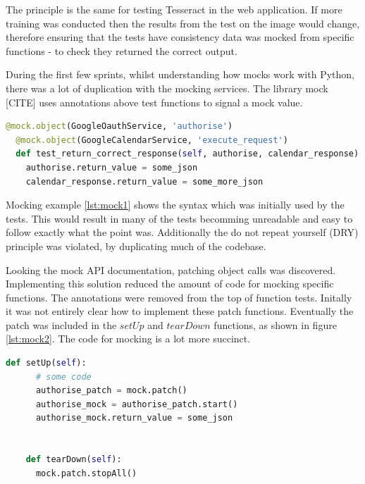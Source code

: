 The principle is the same for testing Tesseract in the web application. If more training was conducted then the results from the test on the image would change, therefore ensuring that the tests have consistency data was mocked from specific functions - to check they returned the correct output.

During the first few sprints, whilst understanding how mocks work with Python, there was a lot of duplication with the mocking services. The library mock [CITE] uses annotations above test functions to signal a mock value.

\begin{lstlisting}[language=python, caption={An example of using mocks, following the annotation pattern}, label={lst:mock1}, breaklines, columns=fullflexible, keywordstyle=\color{blue}]
  @mock.object(GoogleOauthService, 'authorise')
  @mock.object(GoogleCalendarService, 'execute_request')
  def test_return_correct_response(self, authorise, calendar_response):
    authorise.return_value = some_json
    calendar_response.return_value = some_more_json
\end{lstlisting}

Mocking example \ref{lst:mock1} shows the syntax which was initially used by the tests. This would result in many of the tests becomming unreadable and easy to follow exactly what the point was. Additionally the do not repeat yourself (DRY) principle was violated, by duplicating much of the codebase.

Looking the mock API documentation, patching object calls was discovered. Implementing this solution reduced the amount of code for mocking specific functions. The annotations were removed from the top of function tests. Initally it was not entirely clear how to implement these patch functions. Eventually the patch was included in the $setUp$ and $tearDown$ functions, as shown in figure \ref{lst:mock2}. The code for mocking is a lot more succinct.

\begin{lstlisting}[language=python, label={lst:mock2}, breaklines, columns=fullflexible, keywordstyle=\color{blue}, label={Mocks using the patch and start. It stops in the dear downs}]
    def setUp(self):
      # some code
      authorise_patch = mock.patch()
      authorise_mock = authorise_patch.start()
      authorise_mock.return_value = some_json


    def tearDown(self):
      mock.patch.stopAll()
\end{lstlisting}

